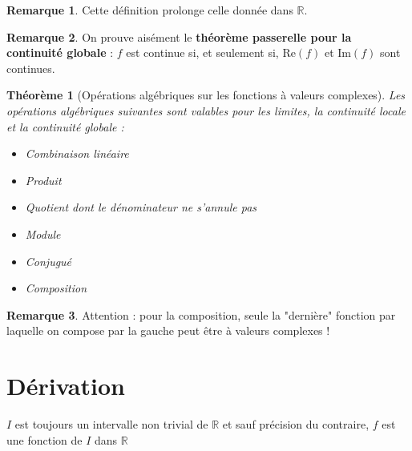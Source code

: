 \documentclass[french]{book}
\newcommand{\R}{\mathbb{R}}
\theoremstyle{plain}
\newtheorem{thm}{Théorème}[chapter]
\theoremstyle{definition}
\newtheorem{rmq}{Remarque}[chapter]
\theoremstyle{remark}
\begin{document}
\begin{rmq}
	Cette définition prolonge celle donnée dans $\R$.
\end{rmq}
\begin{rmq}
	On prouve aisément le \textbf{théorème passerelle pour la continuité globale} : $f$ est continue si, et seulement si, $\text{Re}(f)$ et $\text{Im}(f)$ sont continues.
\end{rmq}
\begin{thm}[Opérations algébriques sur les fonctions à valeurs complexes]
	Les opérations algébriques suivantes sont valables pour les limites, la continuité locale et la continuité globale : 
	\begin{itemize}
		\item Combinaison linéaire
		\item Produit
		\item Quotient dont le dénominateur ne s'annule pas
		\item Module
		\item Conjugué
		\item Composition
	\end{itemize}
\end{thm}
\begin{rmq}
	Attention : pour la composition, seule la "dernière" fonction par laquelle on compose par la gauche peut être à valeurs complexes !
\end{rmq}

\newpage
\chapter{Dérivation}
$I$ est toujours un intervalle non trivial de $\R$ et sauf précision du contraire, $f$ est une fonction de $I$ dans $\R$
\end{document}
